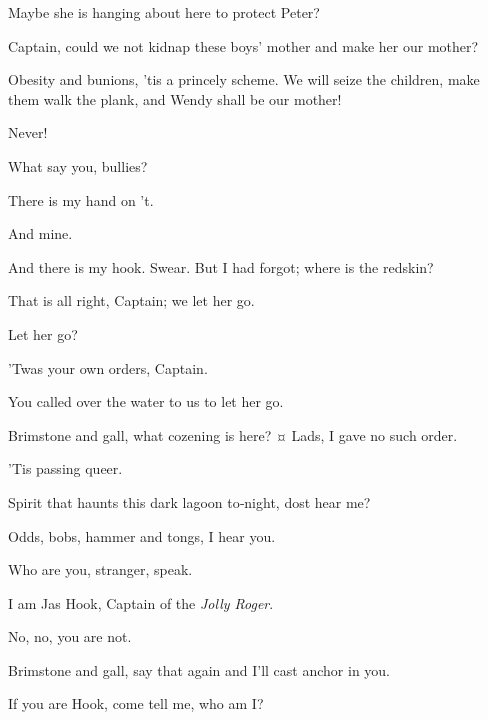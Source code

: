 \begin{drama}
\starkeyspeaks
Maybe she is hanging about here to protect Peter?


Captain, could we not kidnap these boys’ mother and make her our mother?

\hookspeaks
Obesity and bunions, ’tis a princely scheme.
We will seize the children, make them walk the plank, and Wendy shall be our mother!

\wendyspeaks
Never!

\hookspeaks
What say you, bullies?

\smeespeaks
There is my hand on ’t.

\starkeyspeaks
And mine.

\hookspeaks
And there is my hook.
Swear.
But I had forgot; where is the redskin?

That is all right, Captain; we let her go.

Let her go?

\smeespeaks
’Twas your own orders, Captain.

You called over the water to us to let her go.

\hookspeaks
Brimstone and gall, what cozening is here?
¤
Lads, I gave no such order.

\smeespeaks
’Tis passing queer.

Spirit that haunts this dark lagoon to‐night, dost hear me?

Odds, bobs, hammer and tongs, I hear you.

Who are you, stranger, speak.

I am Jas Hook, Captain of the \emph{Jolly Roger}.

No, no, you are not.

\peterspeaks
Brimstone and gall, say that again and I’ll cast anchor in you.

\hookspeaks
If you are Hook, come tell me, who am I?


\end{drama}
